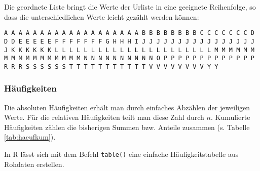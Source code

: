 \documentclass[
  ngerman,
]{article}
\begin{document}
Die geordnete Liste bringt die Werte der Urliste in eine geeignete Reihenfolge, so dass die unterschiedlichen Werte leicht gezählt werden können:

\texttt{A\ A\ A\ A\ A\ A\ A\ A\ A\ A\ A\ A\ A\ A\ A\ A\ A\ A\ A\ B\ B\ B\ B\ B\ B\ B\ B\ C\ C\ C\ C\ C\ C\ C\ D\ D\ D\ E\ E\ E\ E\ E\ F\ F\ F\ F\ F\ F\ F\ G\ H\ H\ H\ I\ J\ J\ J\ J\ J\ J\ J\ J\ J\ J\ J\ J\ J\ J\ J\ J\ J\ K\ K\ K\ K\ K\ K\ L\ L\ L\ L\ L\ L\ L\ L\ L\ L\ L\ L\ L\ L\ L\ L\ L\ L\ L\ L\ L\ L\ M\ M\ M\ M\ M\ M\ M\ M\ M\ M\ M\ M\ M\ M\ M\ M\ M\ N\ N\ N\ N\ N\ N\ N\ N\ N\ N\ O\ P\ P\ P\ P\ P\ P\ P\ P\ P\ P\ P\ P\ P\ R\ R\ R\ S\ S\ S\ S\ S\ S\ T\ T\ T\ T\ T\ T\ T\ T\ T\ T\ T\ V\ V\ V\ V\ V\ V\ V\ V\ Y\ Y}

\hypertarget{huxe4ufigkeiten}{%
\subsubsection{Häufigkeiten}\label{huxe4ufigkeiten}}

Die absoluten Häufigkeiten erhält man durch einfaches Abzählen der jeweiligen Werte. Für die relativen Häufigkeiten teilt man diese Zahl durch \(n\). Kumulierte Häufigkeiten zählen die bisherigen Summen bzw. Anteile zusammen (s. Tabelle \ref{tab:haeufkum}).

\begin{rtip}
In R lässt sich mit dem Befehl {\tt table()} eine einfache Häufigkeitstabelle aus Rohdaten erstellen.
\end{rtip}
\end{document}
